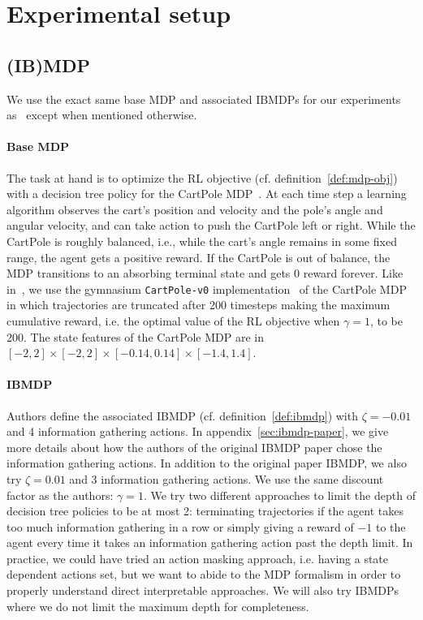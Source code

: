 \section{Experimental setup}
\subsection{(IB)MDP} 

We use the exact same base MDP and associated IBMDPs for our experiments as~\cite{topin2021iterative} except when mentioned otherwise.

\paragraph{Base MDP} The task at hand is to optimize the RL objective (cf. definition~\ref{def:mdp-obj}) with a decision tree policy for the CartPole MDP~\cite{cartpole}.
At each time step a learning algorithm observes the cart's position and velocity and the pole's angle and angular velocity, and can take action to push the CartPole left or right.
While the CartPole is roughly balanced, i.e., while the cart's angle remains in some fixed range, the agent gets a positive reward.
If the CartPole is out of balance, the MDP transitions to an absorbing terminal state and gets 0 reward forever.
Like in~\cite{topin2021iterative}, we use the gymnasium \texttt{CartPole-v0} implementation~\cite{gymnasium} of the CartPole MDP in which trajectories are truncated after 200 timesteps making the maximum cumulative reward, i.e. the optimal value of the RL objective when $\gamma=1$, to be 200.
The state features of the CartPole MDP are in $[-2, 2] \times [-2, 2] \times [-0.14, 0.14] \times [-1.4, 1.4]$.

\paragraph{IBMDP} Authors define the associated IBMDP (cf. definition~\ref{def:ibmdp}) with $\zeta=-0.01$ and 4 information gathering actions.
In appendix~\ref{sec:ibmdp-paper}, we give more details about how the authors of the original IBMDP paper chose the information gathering actions.
In addition to the original paper IBMDP, we also try $\zeta=0.01$ and 3 information gathering actions.
We use the same discount factor as the authors: $\gamma=1$.
We try two different approaches to limit the depth of decision tree policies to be at most 2: terminating trajectories if the agent takes too much information gathering in a row or simply giving a reward of $-1$ to the agent every time it takes an information gathering action past the depth limit.
In practice, we could have tried an action masking approach, i.e. having a state dependent actions set, but we want to abide to the MDP formalism in order to properly understand direct interpretable approaches.
We will also try IBMDPs where we do not limit the maximum depth for completeness.


